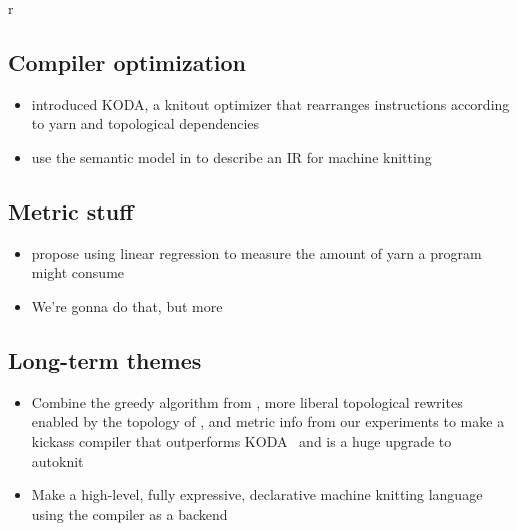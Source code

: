 r\documentclass[acmsmall,screen,review,anonymous,nonacm]{acmart}
\begin{document}
\subsection{Compiler optimization}
\begin{itemize}
    \item \citet{10.1145/3654777.3676405} introduced KODA,
    a knitout optimizer that rearranges instructions according
    to yarn and topological dependencies
    \item \citet{10.1145/3687948} use the semantic model
    in \citet{Lin2023} to describe an IR for machine knitting
\end{itemize}

\subsection{Metric stuff}
\begin{itemize}
    \item \citet{Ohlson2023} propose using linear regression
    to measure the amount of yarn a program might consume
    \item We're gonna do that, but more
\end{itemize}

\subsection{Long-term themes}
\begin{itemize}
    \item Combine the greedy algorithm from \citet{10.1145/3654777.3676405},
    more liberal topological rewrites
    enabled by the topology of \citet{Hurtig2025},
    and metric info from our experiments to make a kickass compiler
    that outperforms KODA~\cite{10.1145/3654777.3676405} and is a huge
    upgrade to autoknit~\cite{2018-autoknit}
    \item Make a high-level, fully expressive, declarative machine knitting
    language using the compiler as a backend
\end{itemize}



\end{document}

